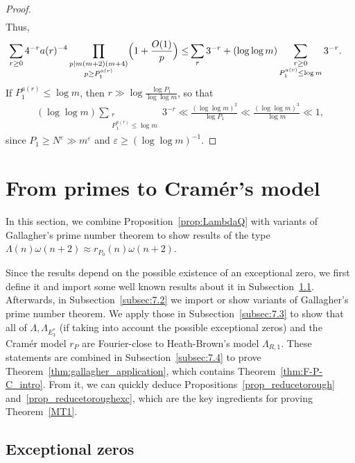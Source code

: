 \documentclass[12pt]{amsart}
\theoremstyle{definition}
\theoremstyle{remark}
\numberwithin{equation}{section}
\newcommand{\1}{\mathbf{1}}
\begin{document}
\begin{proof}
\begin{align*}
    \end{align*}
    Thus,
    \begin{align*}
        \sum_{r\geq 0}4^{-r}a(r)^{-4}\prod_{\substack{p\mid m (m+2)(m+4)\\ p\geq P_1^{a(r)}}}\Bigl(1+\frac{O(1)}{p}\Bigr) \leq&  \sum_{r}3^{-r}+(\log \log m)\sum_{\substack{r\geq 0\\ P_1^{a(r)}\leq \log m}}3^{-r}.
    \end{align*}
    If $ P_1^{a(r)}\leq \log m$, then  $r\gg \log \frac{\log P_1}{\log \log m}$,
    so that
    \begin{align*}
        (\log \log m)\sum_{\substack{r\\ P_1^{a(r)}\leq \log m}}3^{-r}\ll \frac{(\log \log m)^2}{\log P_1}\ll  \frac{(\log \log m)^3}{\log  m}\ll 1,
    \end{align*}
    since $P_1\geq N^{\varepsilon}\gg m^{\varepsilon}$ and $\varepsilon\geq (\log \log m)^{-1}$. 
\end{proof}






\section{From primes to Cram\'er's model}\label{sec:PrimestoRough}
	
In this section, we combine Proposition~\ref{prop:LambdaQ} with variants of Gallagher's prime number theorem to show results of the type $\Lambda(n)\omega(n+2)\approx r_{P_0}(n)\omega(n+2) $. 

Since the results depend on the possible existence of an exceptional zero, we first define it and import some well known results about it in Subsection~\ref{subsec:7.1}. Afterwards, in Subsection~\ref{subsec:7.2} we import or show variants of Gallagher's prime number theorem. We apply those in Subsection~\ref{subsec:7.3} to show that all of $\Lambda, \Lambda_{E_3^*}$ (if taking into account the possible exceptional zeros) and the Cram\'er model $r_P$ are Fourier-close to Heath-Brown's model $\Lambda_{R,1}$. These statements are combined in Subsection~\ref{subsec:7.4} to prove Theorem~\ref{thm:gallagher_application}, which contains Theorem~\ref{thm:F-P-C_intro}. From it, we can quickly deduce Propositions~\ref{prop_reducetorough} and~\ref{prop_reducetoroughexc}, which are the key ingredients for proving Theorem~\ref{MT1}.




\subsection{Exceptional zeros}\label{subsec:7.1}
\end{document}
